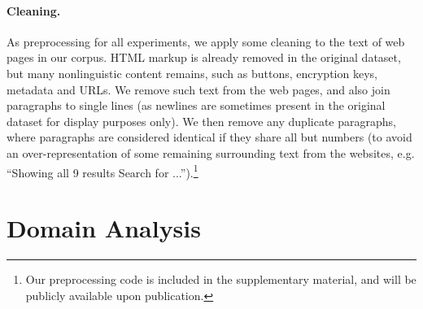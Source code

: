 \documentclass[11pt,a4paper,table]{article}
\begin{document}
\paragraph{Cleaning.}

As preprocessing for all experiments, we apply some cleaning to the text
of web pages in our corpus.
HTML markup is already removed in the original dataset,
but many nonlinguistic content remains, such as
buttons, encryption keys, metadata and URLs.
We remove such text from the web pages, and also join paragraphs to single lines
(as newlines are sometimes present in the original dataset for display purposes
only).
We then remove any duplicate paragraphs, where paragraphs are considered
identical if they share all but numbers
(to avoid an over-representation of some remaining surrounding text from the
websites, e.g. ``Showing all 9 results Search for
...'').\footnote{Our preprocessing code is included in the supplementary
material, and will be publicly available upon publication.}

\section{Domain Analysis}
\end{document}
